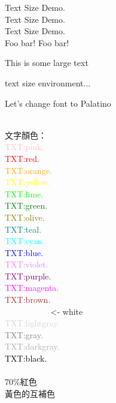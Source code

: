 \documentclass[12pt]{article}
\begin{document}
\begin{CJK*}{UTF8}{bkai}
	{\fontsize{22}{\baselineskip}\selectfont Text Size Demo.\\}
	{\fontsize{23}{\baselineskip}\selectfont Text Size Demo.\\}
	{\fontsize{24}{\baselineskip}\selectfont Text Size Demo.\\}
	{\fontsize{50}{60}\selectfont Foo}
	{\fontsize{5}{6}\selectfont bar!}
	{\Huge Foo}
	{\tiny bar!}
	{\Large This is some large text\par}
	\begin{footnotesize}
		text size environment...
	\end{footnotesize}

	Let's change font to {\selectfont Palatino} %
	
	\noindent\mbox{}\\
	文字顏色：\\
	{\textcolor{pink}{TXT:pink.}} \\
	{\textcolor{red}{TXT:red.}} \\
	{\textcolor{orange}{TXT:orange.}} \\
	{\textcolor{yellow}{TXT:yellow.}} \\
	{\textcolor{lime}{TXT:lime.}} \\
	{\textcolor{green}{TXT:green.}} \\
	{\textcolor{olive}{TXT:olive.}} \\
	{\textcolor{teal}{TXT:teal.}} \\
	{\textcolor{cyan}{TXT:cyan.}} \\
	{\textcolor{blue}{TXT:blue.}} \\
	{\textcolor{violet}{TXT:violet.}} \\
	{\textcolor{purple}{TXT:purple.}} \\
	{\textcolor{magenta}{TXT:magenta.}} \\
	{\textcolor{brown}{TXT:brown.}} \\
	{\textcolor{white}{TXT:white.}} \textless- white\\
	{\textcolor{lightgray}{TXT:lightgray.}} \\
	{\textcolor{gray}{TXT:gray.}} \\
	{\textcolor{darkgray}{TXT:darkgray.}} \\
	{\textcolor{black}{TXT:black.}} \\
	\mbox{}\\
	{\textcolor{red!70}{70\%紅色}} \\
	{\textcolor{-yellow}{黃色的互補色}} \\


\end{CJK*}
\end{document}
